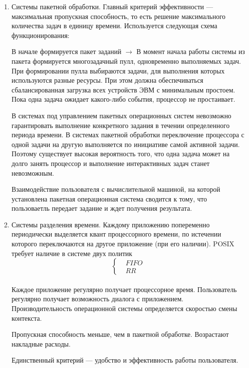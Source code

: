 \begin{enumerate}
  \item Системы пакетной обработки. Главный критерий эффективности ---
    максимальная пропускная способность, то есть решение максимального
    количества задач в единицу времени. Используется следующая схема
    функционирования:\par
    В начале формируется пакет заданий $\to$ В момент начала
    работы системы из пакета формируется многозадачный пулл, одновременно
    выполняемых задач. При формировании пулла выбираются задачи, для выполнения
    которых используются разные ресурсы. При этом должна обеспечиваться
    сбалансированная загрузка всех устройств ЭВМ с минимальным простоем. Пока
    одна задача ожидает какого-либо события, процессор не простаивает.\par В
    системах под управлением пакетных операционных систем невозможно
    гарантировать выполнение конкретного задания в течении определенного периода
    времени. В системах пакетной обработки переключение процессора с одной
    задачи на другую выполняется по инициативе самой активной задачи. Поэтому
    существует высокая вероятность того, что одна задача может на долго занять
    процессор и выполнение интерактивных задач станет невозможным.\par
    Взаимодействие пользователя с вычислительной машиной, на которой 
    установлена пакетная операционная система сводится к тому, что пользоваетль 
    передает задание и ждет получения результата.

	\item Системы разделения времени. Каждому приложению попеременно периодически
    выделяется квант процессорного времени, по истечении которого переключаются
    на другое приложение (при его наличии). {\ttfamily POSIX требует наличие в
    системе двух политик \[ \left\{\begin{aligned} &FIFO \\ &RR
    \end{aligned}\right. \]}\\ Каждое приложение регулярно получает процессорное
    время. Пользователь регулярно получает возможность диалога с приложением. 
    Производительность операционной системы определяется скоростью смены
    контекста.\par
    Пропускная способность меньше, чем в пакетной обработке. Возрастают
    накладные расходы. \par
    Единственный критерий --- удобство и эффективность работы пользователя.


\end{enumerate}

